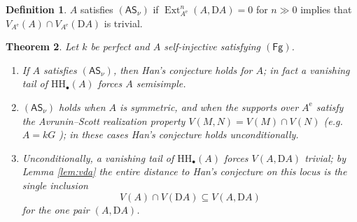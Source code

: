 \documentclass[11pt]{amsart}
\newtheorem{theorem}{Theorem}[section]
\theoremstyle{definition}
\newtheorem{definition}[theorem]{Definition}
\newcommand{\HH}{\mathrm{HH}}
\newcommand{\D}{\mathrm{D}}
\newcommand{\Ext}{\operatorname{Ext}}
\newcommand{\Ae}{A^{\mathrm{e}}}
\newcommand{\kk}{k}
\newcommand{\Fg}{\mathsf{(Fg)}}
\begin{document}
\begin{definition}
$A$ satisfies $\mathsf{(AS_\nu)}$ if
$\Ext^n_{\Ae}(A,\D A)=0$ for $n\gg0$ implies that
$V_{\Ae}(A)\cap V_{\Ae}(\D A)$ is trivial.
\end{definition}

\begin{theorem}\label{thm:asnu}
Let $\kk$ be perfect and $A$ self-injective satisfying $\Fg$.
\begin{enumerate}
\item If $A$ satisfies $\mathsf{(AS_\nu)}$, then Han's conjecture holds for
$A$; in fact a vanishing tail of $\HH_\bullet(A)$ forces $A$ semisimple.
\item $\mathsf{(AS_\nu)}$ holds when $A$ is symmetric, and when the supports
over $\Ae$ satisfy the Avrunin--Scott realization property
$V(M,N)=V(M)\cap V(N)$ (e.g.\ $A=\kk G$ \cite{AvruninScott}); in these cases
Han's conjecture holds unconditionally.
\item Unconditionally, a vanishing tail of $\HH_\bullet(A)$ forces
$V(A,\D A)$ trivial; by Lemma \ref{lem:vda} the entire distance to Han's
conjecture on this locus is the single inclusion
$$V(A)\cap V(\D A)\subseteq V(A,\D A)$$ for the one pair $(A,\D A)$.
\end{enumerate}
\end{theorem}
\end{document}
